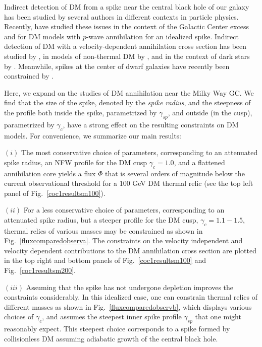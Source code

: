 \documentclass[11pt]{article}
\begin{document}
Indirect detection of DM from a spike near the central black hole of our galaxy has been studied  by several authors in different contexts in  particle physics. Recently, \cite{Fields:2014pia,Shelton:2015aqa,Shapiro:2016ypb} have studied these issues in the context of the Galactic Center excess and for DM models with $p$-wave annihilation for an idealized spike. Indirect detection of DM with a velocity-dependent annihilation cross section has been studied by \cite{Amin:2007ir}, in models of non-thermal DM by \cite{Sandick:2011rp}, and in the context of dark stars by \cite{Sandick:2010qu,Sandick:2010yd,Schoonenberg:2016aml}. Meanwhile, spikes at the center of dwarf galaxies have recently been constrained by \cite{Wanders:2014xia, Gonzalez-Morales:2014eaa}. 

Here, we expand on the studies of DM annihilation near the Milky Way GC.  We find that the size of the spike, denoted by the {\it spike radius}, and the steepness of the profile both inside the spike, parametrized by $\gamma_{sp}$, and outside (in the cusp), parametrized by $\gamma_c$, have a strong effect on the resulting constraints on DM models. For convenience, we summarize our main results: 

$(i)$ The most conservative choice of parameters, corresponding to an attenuated spike radius, an NFW profile for the DM cusp $\gamma_c = 1.0$, and a flattened annihilation core yields a flux $\Phi$ that is several orders of magnitude below the current observational threshold for a 100 GeV DM thermal relic (see the top left panel of Fig.~\ref{coc1resultsm100}).

$(ii)$ For a less conservative choice of parameters, corresponding to an attenuated spike radius, but a steeper profile for the DM cusp, $\gamma_c = 1.1-1.5$, thermal relics of various masses may be constrained as shown in  Fig.~\ref{fluxcomparedobserva}. The constraints on the velocity independent and velocity dependent contributions to the DM annihilation cross section are plotted in the top right and bottom panels of Fig.~\ref{coc1resultsm100} and Fig.~\ref{coc1resultsm200}.

$(iii)$ Assuming that the spike has not undergone depletion improves the constraints considerably. In this idealized case, one can constrain thermal relics of different masses as shown in Fig.~\ref{fluxcomparedobservb}, which displays various choices of $\gamma_c$, and assumes the steepest inner spike profile $\gamma_{sp}$ that one might reasonably expect. This steepest choice corresponds to a spike formed by collisionless DM assuming adiabatic growth of the central black hole.
\end{document}
